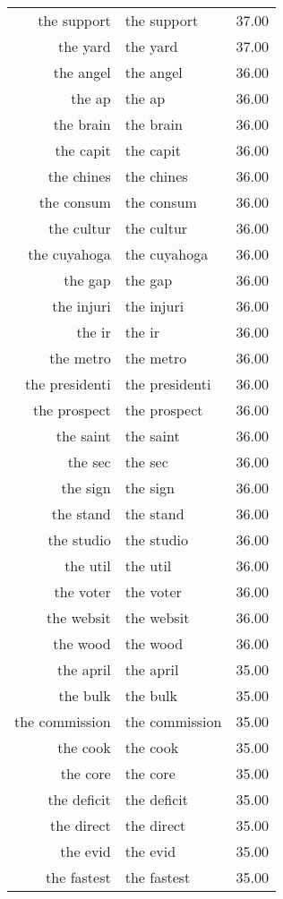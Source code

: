 \begin{table}[ht]
\begin{tabular}{rlr}
  the support & the support & 37.00 \\ 
  the yard & the yard & 37.00 \\ 
  the angel & the angel & 36.00 \\ 
  the ap & the ap & 36.00 \\ 
  the brain & the brain & 36.00 \\ 
  the capit & the capit & 36.00 \\ 
  the chines & the chines & 36.00 \\ 
  the consum & the consum & 36.00 \\ 
  the cultur & the cultur & 36.00 \\ 
  the cuyahoga & the cuyahoga & 36.00 \\ 
  the gap & the gap & 36.00 \\ 
  the injuri & the injuri & 36.00 \\ 
  the ir & the ir & 36.00 \\ 
  the metro & the metro & 36.00 \\ 
  the presidenti & the presidenti & 36.00 \\ 
  the prospect & the prospect & 36.00 \\ 
  the saint & the saint & 36.00 \\ 
  the sec & the sec & 36.00 \\ 
  the sign & the sign & 36.00 \\ 
  the stand & the stand & 36.00 \\ 
  the studio & the studio & 36.00 \\ 
  the util & the util & 36.00 \\ 
  the voter & the voter & 36.00 \\ 
  the websit & the websit & 36.00 \\ 
  the wood & the wood & 36.00 \\ 
  the april & the april & 35.00 \\ 
  the bulk & the bulk & 35.00 \\ 
  the commission & the commission & 35.00 \\ 
  the cook & the cook & 35.00 \\ 
  the core & the core & 35.00 \\ 
  the deficit & the deficit & 35.00 \\ 
  the direct & the direct & 35.00 \\ 
  the evid & the evid & 35.00 \\ 
  the fastest & the fastest & 35.00 \\ 

\end{tabular}
\end{table}
